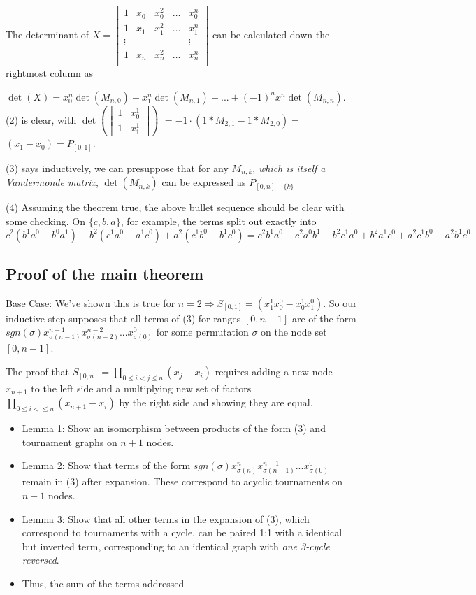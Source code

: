 \documentclass[11pt, oneside]{article} 	%
\begin{document}
The determinant of 
 $X = \begin{bmatrix}
1 & x_0 & x_0^2 & \ldots & x_0^{n} \\
1 & x_1 & x_1^2 & \ldots & x_1^{n} \\
\vdots & & & & \vdots  \\
1 & x_{n} & x_{n}^2 & \ldots & x_{n}^{n} \\
\end{bmatrix}
$ can be calculated down the rightmost column as

$\det(X) = x_0^n \det(M_{n,0}) - x_1^n \det(M_{n,1}) +  ... + (-1)^n x^n \det(M_{n,n})$.
\\

(2) is clear, with 
$\det(\begin{bmatrix} 1 & x_0^1 \\ 1& x_1^1 \end{bmatrix})$
$= -1\cdot(1* M_{2, 1} - 1* M_{2,0}) = $
$(x_1 - x_0) = P_{[0,1]}$.

(3) says inductively, we can presuppose that  for any $M_{n, k}$, \emph{which is itself a Vandermonde matrix}, $\det(M_{n,k})$ can be expressed as $P_{[0,n] - \{k\}}$

(4)
Assuming the theorem true, the above bullet sequence should be clear with some checking.  On  $\{c,b,a\}$, for example, the terms split out exactly into $c^2(b^1a^0 - b^0a^1) - b^2(c^1a^0-a^1c^0) + a^2(c^1b^0-b^1c^0) = c^2b^1a^0 - c^2a^0b^1 - b^2c^1a^0 + b^2a^1c^0 + a^2c^1b^0 - a^2b^1c^0$


\subsection{Proof of the main theorem}

Base Case: We've shown this is true for  $n=2 \Rightarrow S_{[0,1]} = (x_1^1x_0^0 - x_0^1x_1^0)$.  
So our inductive step supposes that all terms of (3) for ranges $[0, n-1]$ are of the form  $sgn(\sigma) x_{\sigma(n-1)}^{n-1} x_{\sigma(n-2)}^{n-2} ... x_{\sigma(0)}^{0} $ for some permutation $\sigma$ on the node set $[0, n-1]$.  

The proof that  $S_[0,n] = \prod_{0 \leq i < j \leq n} (x_j - x_i)$ requires adding a new node $x_{n+1}$ to the left side and a multiplying new set of factors $\prod_{0 \leq i < \leq n} (x_{n+1} - x_i)$ by the right side and showing they are equal.

\begin{itemize}
\item Lemma 1: Show an isomorphism between products of the form (3) and tournament graphs on $n+1$ nodes.
\item Lemma 2: Show that terms of the form $sgn(\sigma) x_{\sigma(n)}^n x_{\sigma(n-1)}^{n-1} ... x_{\sigma(0)}^{0} $ remain in (3) after expansion.  These correspond to acyclic tournaments on $n+1$ nodes.
\item Lemma 3: Show that all other terms in the expansion of (3), which correspond to tournaments with a cycle, can be paired 1:1 with a identical but inverted term, corresponding to an identical graph with \emph{one 3-cycle reversed}.
\item Thus, the sum of the terms addressed 
\end{itemize}
\end{document}

